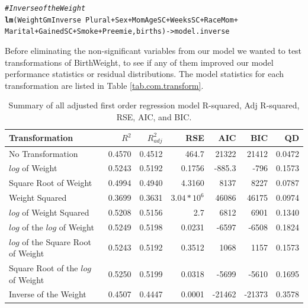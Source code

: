 \documentclass{article}\usepackage[]{graphicx}\usepackage[]{xcolor}
\makeatletter
\newcommand{\hlcom}[1]{\textcolor[rgb]{0.678,0.584,0.686}{\textit{#1}}}%
\newcommand{\hlopt}[1]{\textcolor[rgb]{0,0,0}{#1}}%
\newcommand{\hlstd}[1]{\textcolor[rgb]{0.345,0.345,0.345}{#1}}%
\newcommand{\hlkwb}[1]{\textcolor[rgb]{0.69,0.353,0.396}{#1}}%
\newcommand{\hlkwd}[1]{\textcolor[rgb]{0.737,0.353,0.396}{\textbf{#1}}}%
\newenvironment{kframe}{%
 \def\at@end@of@kframe{}%
 \ifinner\ifhmode%
  \def\at@end@of@kframe{\end{minipage}}%
  \begin{minipage}{\columnwidth}%
 \fi\fi%
 \def\FrameCommand##1{\hskip\@totalleftmargin \hskip-\fboxsep
 \colorbox{shadecolor}{##1}\hskip-\fboxsep
     \hskip-\linewidth \hskip-\@totalleftmargin \hskip\columnwidth}%
 \MakeFramed {\advance\hsize-\width
   \@totalleftmargin\z@ \linewidth\hsize
   \@setminipage}}%
 {\par\unskip\endMakeFramed%
 \at@end@of@kframe}
\newenvironment{knitrout}{}{} %
\makeatother
\begin{document}
\begin{knitrout}
\begin{kframe}
\begin{alltt}
\hlcom{# Inverse of the Weight}
\hlkwd{lm}\hlstd{(WeightGmInverse} \hlopt{~} \hlstd{Plural} \hlopt{+} \hlstd{Sex} \hlopt{+} \hlstd{MomAgeSC} \hlopt{+} \hlstd{WeeksSC} \hlopt{+} \hlstd{RaceMom} \hlopt{+}
     \hlstd{Marital} \hlopt{+} \hlstd{GainedSC} \hlopt{+} \hlstd{Smoke} \hlopt{+} \hlstd{Preemie, births)} \hlkwb{->} \hlstd{model.inverse}
\end{alltt}
\end{kframe}
\end{knitrout}

Before eliminating the non-significant variables from our model we wanted to test transformations of BirthWeight, to see if any of them improved our model performance statistics or residual distributions. The model statistics for each transformation are listed in Table \ref{tab.com.transform}. 

\begin{table}[H]
\centering
\begin{tabular}{lrrrrrr}
  \hline
  Transformation & $R^2$ & $R^2_{adj}$ & RSE & AIC & BIC & QD\\ 
  \hline
   No Transformation & 0.4570 & 0.4512 & 464.7 & 21322 & 21412 & 0.0472 \\ 
   $log$ of Weight & 0.5243 & 0.5192 & 0.1756 & -885.3 & -796 & 0.1573\\ 
   Square Root of Weight & 0.4994 & 0.4940 & 4.3160 & 8137 & 8227 & 0.0787 \\
   Weight Squared & 0.3699 & 0.3631 & $3.04 * 10^6$ & 46086 & 46175 & 0.0974 \\
   $log$ of Weight Squared & 0.5208 & 0.5156 & 2.7 & 6812 & 6901 & 0.1340\\
   $log$ of the $log$ of Weight & 0.5249 & 0.5198 & 0.0231 & -6597 & -6508 & 0.1824 \\
   $log$ of the Square Root of Weight & 0.5243 & 0.5192 & 0.3512 & 1068 & 1157 & 0.1573\\
   Square Root of the $log$ of Weight & 0.5250 & 0.5199 & 0.0318 & -5699 & -5610 & 0.1695\\
   Inverse of the Weight & 0.4507 & 0.4447 & 0.0001 & -21462 & -21373 & 0.3578 \\
   \hline
\end{tabular}
\caption{Summary of all adjusted first order regression model R-squared, Adj R-squared, RSE, AIC, and BIC.}
\label{tab.comp.transform}
\end{table}
\end{document}
